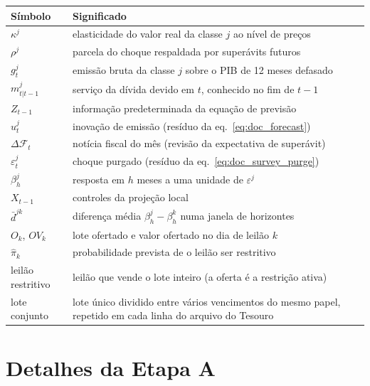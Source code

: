 \documentclass[12pt,a4paper]{article}
\begin{document}
\begin{center}
\small
\begin{longtable}{p{}p{}}
\toprule
Símbolo & Significado \\
\midrule
\endhead
\(\kappa^j\) & elasticidade do valor real da classe \(j\) ao nível de preços \\
\(\rho^j\) & parcela do choque respaldada por superávits futuros \\
\(g_t^j\) & emissão bruta da classe \(j\) sobre o PIB de 12 meses defasado \\
\(m_{t|t-1}^j\) & serviço da dívida devido em \(t\), conhecido no fim de \(t-1\) \\
\(Z_{t-1}\) & informação predeterminada da equação de previsão \\
\(u_t^j\) & inovação de emissão (resíduo da eq.~\ref{eq:doc_forecast}) \\
\(\Delta\mathcal{F}_t\) & notícia fiscal do mês (revisão da expectativa de superávit) \\
\(\varepsilon_t^j\) & choque purgado (resíduo da eq.~\ref{eq:doc_survey_purge}) \\
\(\beta_h^j\) & resposta em \(h\) meses a uma unidade de \(\varepsilon^j\) \\
\(X_{t-1}\) & controles da projeção local \\
\(\bar d^{jk}\) & diferença média \(\beta_h^j-\beta_h^k\) numa janela de horizontes \\
\(O_k\), \(OV_k\) & lote ofertado e valor ofertado no dia de leilão \(k\) \\
\(\hat\pi_k\) & probabilidade prevista de o leilão ser restritivo \\
leilão restritivo & leilão que vende o lote inteiro (a oferta é a restrição ativa) \\
lote conjunto & lote único dividido entre vários vencimentos do mesmo papel, repetido
em cada linha do arquivo do Tesouro \\
\bottomrule
\end{longtable}
\end{center}

\appendix

\section{Detalhes da Etapa A}\label{app:etapaA}
\end{document}
